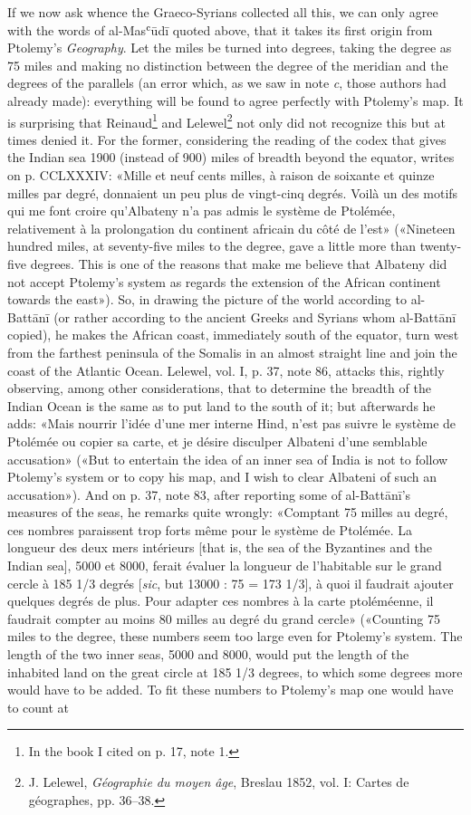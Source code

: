 \documentclass[11pt]{article}
\begin{document}
\par If we now ask whence the Graeco-Syrians collected all this, we can only agree with the words of al-Masʿūdī quoted above, that it takes its first origin from Ptolemy's \emph{Geography}. Let the miles be turned into degrees, taking the degree as 75 miles and making no distinction between the degree of the meridian and the degrees of the parallels (an error which, as we saw in note \emph{c}, those authors had already made): everything will be found to agree perfectly with Ptolemy's map. It is surprising that Reinaud\footnote{In the book I cited on p. 17, note 1.} and Lelewel\footnote{J. Lelewel, \emph{Géographie du moyen âge}, Breslau 1852, vol. I: Cartes de géographes, pp. 36–38.} not only did not recognize this but at times denied it. For the former, considering the reading of the codex that gives the Indian sea 1900 (instead of 900) miles of breadth beyond the equator, writes on p. CCLXXXIV: «Mille et neuf cents milles, à raison de soixante et quinze milles par degré, donnaient un peu plus de vingt-cinq degrés. Voilà un des motifs qui me font croire qu’Albateny n’a pas admis le système de Ptolémée, relativement à la prolongation du continent africain du côté de l’est» («Nineteen hundred miles, at seventy-five miles to the degree, gave a little more than twenty-five degrees. This is one of the reasons that make me believe that Albateny did not accept Ptolemy's system as regards the extension of the African continent towards the east»). So, in drawing the picture of the world according to al-Battānī (or rather according to the ancient Greeks and Syrians whom al-Battānī copied), he makes the African coast, immediately south of the equator, turn west from the farthest peninsula of the Somalis in an almost straight line and join the coast of the Atlantic Ocean. Lelewel, vol. I, p. 37, note 86, attacks this, rightly observing, among other considerations, that to determine the breadth of the Indian Ocean is the same as to put land to the south of it; but afterwards he adds: «Mais nourrir l’idée d’une mer interne Hind, n’est pas suivre le système de Ptolémée ou copier sa carte, et je désire disculper Albateni d’une semblable accusation» («But to entertain the idea of an inner sea of India is not to follow Ptolemy's system or to copy his map, and I wish to clear Albateni of such an accusation»). And on p. 37, note 83, after reporting some of al-Battānī's measures of the seas, he remarks quite wrongly: «Comptant 75 milles au degré, ces nombres paraissent trop forts même pour le système de Ptolémée. La longueur des deux mers intérieurs [that is, the sea of the Byzantines and the Indian sea], 5000 et 8000, ferait évaluer la longueur de l’habitable sur le grand cercle à 185 1/3 degrés [\emph{sic}, but 13000 : 75 = 173 1/3], à quoi il faudrait ajouter quelques degrés de plus. Pour adapter ces nombres à la carte ptoléméenne, il faudrait compter au moins 80 milles au degré du grand cercle» («Counting 75 miles to the degree, these numbers seem too large even for Ptolemy's system. The length of the two inner seas, 5000 and 8000, would put the length of the inhabited land on the great circle at 185 1/3 degrees, to which some degrees more would have to be added. To fit these numbers to Ptolemy's map one would have to count at 
\end{document}
